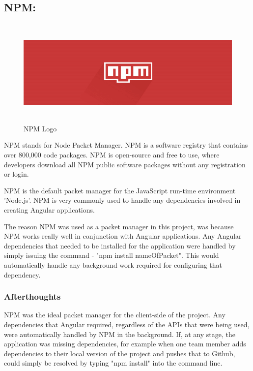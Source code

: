 \subsection{NPM:}
\label{sec:TechnologyReviewNPM}

\begin{figure}[H]
    \centering
    \includegraphics[width=\textwidth, height=150pt]{img/npmLogo.PNG}
    \caption{NPM Logo}
    \label{fig:my_label}
\end{figure}

\bigskip

NPM stands for Node Packet Manager. NPM is a software registry that contains over 800,000 code packages. NPM is open-source and free to use, where developers download all NPM public software packages without any registration or login.

NPM is the default packet manager for the JavaScript run-time environment 'Node.js'. NPM is very commonly used to handle any dependencies involved in creating Angular applications. 

\bigskip

The reason NPM was used as a packet manager in this project, was because NPM works really well in conjunction with Angular applications. Any Angular dependencies that needed to be installed for the application were handled by simply issuing the command - "npm install nameOfPacket". This would automatically handle any background work required for configuring that dependency. 

\subsubsection{Afterthoughts}

NPM was the ideal packet manager for the client-side of the project. Any dependencies that Angular required, regardless of the APIs that were being used, were automatically handled by NPM in the background. If, at any stage, the application was missing dependencies, for example when one team member adds dependencies to their local version of the project and pushes that to Github, could simply be resolved by typing "npm install" into the command line.
\bigskip


